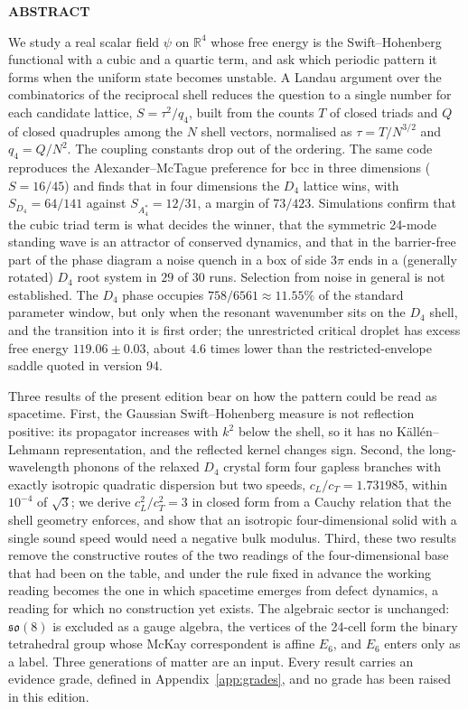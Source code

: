 \documentclass[a4paper,11pt]{article}
\renewenvironment{abstract}
  {\begin{jsabstractbox}{\small\bfseries\color{truetext}\MakeUppercase{Abstract}\par}\vspace{3pt}\small}
  {\end{jsabstractbox}}
\numberwithin{equation}{section}
\theoremstyle{jsplain}
\theoremstyle{jsrem}
\begin{document}
\begin{abstract}
\noindent
We study a real scalar field $\psi$ on $\mathbb{R}^4$ whose free energy is the Swift--Hohenberg functional with a cubic and a quartic term, and ask which periodic pattern it forms when the uniform state becomes unstable. A Landau argument over the combinatorics of the reciprocal shell reduces the question to a single number for each candidate lattice, $S=\tau^2/q_4$, built from the counts $T$ of closed triads and $Q$ of closed quadruples among the $N$ shell vectors, normalised as $\tau=T/N^{3/2}$ and $q_4=Q/N^2$. The coupling constants drop out of the ordering. The same code reproduces the Alexander--McTague preference for bcc in three dimensions ($S=16/45$) and finds that in four dimensions the $D_4$ lattice wins, with $S_{D_4}=64/141$ against $S_{A_4^*}=12/31$, a margin of $73/423$. Simulations confirm that the cubic triad term is what decides the winner, that the symmetric 24-mode standing wave is an attractor of conserved dynamics, and that in the barrier-free part of the phase diagram a noise quench in a box of side $3\pi$ ends in a (generally rotated) $D_4$ root system in $29$ of $30$ runs. Selection from noise in general is not established. The $D_4$ phase occupies $758/6561\approx11.55\%$ of the standard parameter window, but only when the resonant wavenumber sits on the $D_4$ shell, and the transition into it is first order; the unrestricted critical droplet has excess free energy $119.06\pm0.03$, about $4.6$ times lower than the restricted-envelope saddle quoted in version 94.

Three results of the present edition bear on how the pattern could be read as spacetime. First, the Gaussian Swift--Hohenberg measure is not reflection positive: its propagator increases with $k^2$ below the shell, so it has no Källén--Lehmann representation, and the reflected kernel changes sign. Second, the long-wavelength phonons of the relaxed $D_4$ crystal form four gapless branches with exactly isotropic quadratic dispersion but two speeds, $c_L/c_T=1.731985$, within $10^{-4}$ of $\sqrt3$; we derive $c_L^2/c_T^2=3$ in closed form from a Cauchy relation that the shell geometry enforces, and show that an isotropic four-dimensional solid with a single sound speed would need a negative bulk modulus. Third, these two results remove the constructive routes of the two readings of the four-dimensional base that had been on the table, and under the rule fixed in advance the working reading becomes the one in which spacetime emerges from defect dynamics, a reading for which no construction yet exists. The algebraic sector is unchanged: $\mathfrak{so}(8)$ is excluded as a gauge algebra, the vertices of the 24-cell form the binary tetrahedral group whose McKay correspondent is affine $E_6$, and $E_6$ enters only as a label. Three generations of matter are an input. Every result carries an evidence grade, defined in Appendix~\ref{app:grades}, and no grade has been raised in this edition.
\end{abstract}
\end{document}
